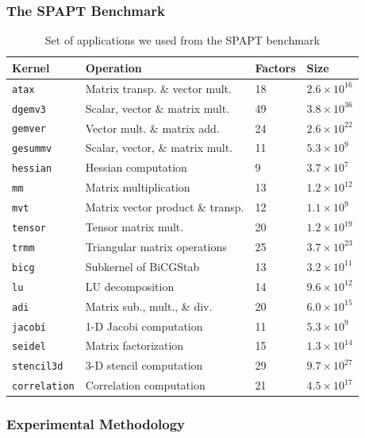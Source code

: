 \documentclass[conference]{IEEEtran}
\begin{document}
\subsubsection{The SPAPT Benchmark}
\label{sec:orgbf93615}
\begin{table}[ht]
\caption{Set of applications we used from the SPAPT benchmark}
\centering
\scriptsize
\begin{tabular}{llll}
\toprule
Kernel & Operation & Factors & Size\\
\midrule
\texttt{atax} & Matrix transp. \& vector mult. & 18 & \(2.6 \times 10^{16}\)\\
\texttt{dgemv3} & Scalar, vector \& matrix mult. & 49 & \(3.8 \times 10^{36}\)\\
\texttt{gemver} & Vector mult. \& matrix add. & 24 & \(2.6 \times 10^{22}\)\\
\texttt{gesummv} & Scalar, vector, \& matrix mult. & 11 & \(5.3 \times 10^{9}\)\\
\texttt{hessian} & Hessian computation & 9 & \(3.7 \times 10^{7}\)\\
\texttt{mm} & Matrix multiplication & 13 & \(1.2 \times 10^{12}\)\\
\texttt{mvt} & Matrix vector product \& transp. & 12 & \(1.1 \times 10^{9}\)\\
\texttt{tensor} & Tensor matrix mult. & 20 & \(1.2 \times 10^{19}\)\\
\texttt{trmm} & Triangular matrix operations & 25 & \(3.7 \times 10^{23}\)\\
\texttt{bicg} & Subkernel of BiCGStab & 13 & \(3.2 \times 10^{11}\)\\
\texttt{lu} & LU decomposition & 14 & \(9.6 \times 10^{12}\)\\
\texttt{adi} & Matrix sub., mult., \& div. & 20 & \(6.0 \times 10^{15}\)\\
\texttt{jacobi} & 1-D Jacobi computation & 11 & \(5.3 \times 10^{9}\)\\
\texttt{seidel} & Matrix factorization & 15 & \(1.3 \times 10^{14}\)\\
\texttt{stencil3d} & 3-D stencil computation & 29 & \(9.7 \times 10^{27}\)\\
\texttt{correlation} & Correlation computation & 21 & \(4.5 \times 10^{17}\)\\
\bottomrule
\end{tabular}
\end{table}
\subsubsection{Experimental Methodology}
\label{sec:orgb6fcd30}
\end{document}
